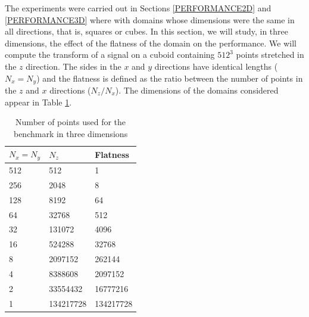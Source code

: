 \documentclass[12pt, a4paper]{article}
\begin{document}
The experiments were carried out in Sections \ref{PERFORMANCE2D} and \ref{PERFORMANCE3D} where with domains whose dimensions were the same in all directions, that is, squares or cubes. In this section, we will study, in three dimensions, the effect of the flatness of the domain on the performance. We will compute the transform of a signal on a cuboid containing $512^3$ points stretched in the $z$ direction. The sides in the $x$ and $y$ directions have identical lengths ($N_x=N_y$) and the flatness is defined as the ratio between the number of points in the $z$ and $x$ directions ($N_z/N_x$). The dimensions of the domains considered appear in Table \ref{FLATNESSDIM}.
\begin{table}[H]
\centering
\begin{tabular}{|l|l|l|}
  \hline
  $N_x=N_y$ & $N_z $ & Flatness\\ 
  \hline
  \hline
512 & 512       & 1\\ \hline
256 & 2048      & 8\\ \hline
128 & 8192      & 64\\ \hline
64  & 32768     & 512\\ \hline
32  & 131072    & 4096\\ \hline
16  & 524288    & 32768\\ \hline
8   & 2097152   & 262144\\ \hline
4   & 8388608   & 2097152\\ \hline
2   & 33554432  & 16777216\\ \hline
1   & 134217728 & 134217728\\ \hline
\end{tabular}
\caption{Number of points used for the benchmark in three dimensions}\label{FLATNESSDIM}
\end{table}
\end{document}

